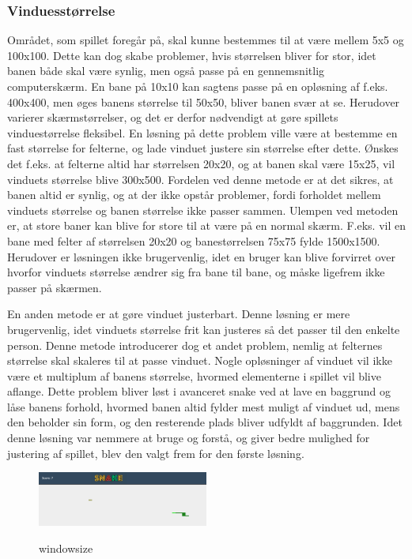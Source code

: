 \documentclass{report}
\begin{document}
\subsubsection{Vinduesstørrelse}
Området, som spillet foregår på, skal kunne bestemmes til at være mellem 5x5 og 100x100. Dette kan dog skabe problemer, hvis størrelsen bliver for stor, idet banen både skal være synlig, men også passe på en gennemsnitlig computerskærm. En bane på 10x10 kan sagtens passe på en opløsning af f.eks. 400x400, men øges banens størrelse til 50x50, bliver banen svær at se. Herudover varierer skærmstørrelser, og det er derfor nødvendigt at gøre spillets vinduestørrelse fleksibel. En løsning på dette problem ville være at bestemme en fast størrelse for felterne, og lade vinduet justere sin størrelse efter dette. Ønskes det f.eks. at felterne altid har størrelsen 20x20, og at banen skal være 15x25, vil vinduets størrelse blive 300x500. Fordelen ved denne metode er at det sikres, at banen altid er synlig, og at der ikke opstår problemer, fordi forholdet mellem vinduets størrelse og banen størrelse ikke passer sammen. Ulempen ved metoden er, at store baner kan blive for store til at være på en normal skærm. F.eks. vil en bane med felter af størrelsen 20x20 og banestørrelsen 75x75 fylde 1500x1500. Herudover er løsningen ikke brugervenlig, idet en bruger kan blive forvirret over hvorfor vinduets størrelse ændrer sig fra bane til bane, og måske ligefrem ikke passer på skærmen.

En anden metode er at gøre vinduet justerbart. Denne løsning er mere brugervenlig, idet vinduets størrelse frit kan justeres så det passer til den enkelte person. Denne metode introducerer dog et andet problem, nemlig at felternes størrelse skal skaleres til at passe vinduet. Nogle opløsninger af vinduet vil ikke være et multiplum af banens størrelse, hvormed elementerne i spillet vil blive aflange. Dette problem bliver løst i avanceret snake ved at lave en baggrund og låse banens forhold, hvormed banen altid fylder mest muligt af vinduet ud, mens den beholder sin form, og den resterende plads bliver udfyldt af baggrunden. Idet denne løsning var nemmere at bruge og forstå, og giver bedre mulighed for justering af spillet, blev den valgt frem for den første løsning.
\begin{figure}[h]
	\centering
	\graphicspath{ {pics/} }
	\includegraphics[width=0.5\textwidth]{WindowSize.png}
	\label{fig:windowsize}
	\caption{windowsize}
\end{figure}
\end{document}

